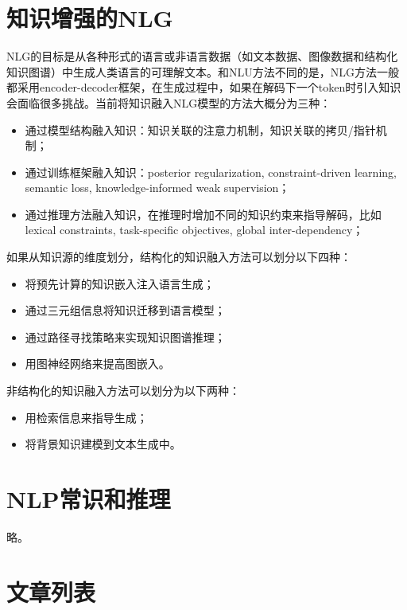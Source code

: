 \documentclass[11pt]{article}
\begin{document}
\section{知识增强的NLG}

NLG的目标是从各种形式的语言或非语言数据（如文本数据、图像数据和结构化知识图谱）中生成人类语言的可理解文本。和NLU方法不同的是，NLG方法一般都采用encoder-decoder框架，在生成过程中，如果在解码下一个token时引入知识会面临很多挑战。当前将知识融入NLG模型的方法大概分为三种：

\begin{itemize}
    \item 通过模型结构融入知识：知识关联的注意力机制，知识关联的拷贝/指针机制；
    \item 通过训练框架融入知识：posterior regularization, constraint-driven learning, semantic loss, knowledge-informed weak supervision；
    \item 通过推理方法融入知识，在推理时增加不同的知识约束来指导解码，比如lexical constraints, task-specific objectives, global inter-dependency；
\end{itemize}

如果从知识源的维度划分，结构化的知识融入方法可以划分以下四种：

\begin{itemize}
    \item 将预先计算的知识嵌入注入语言生成；
    \item 通过三元组信息将知识迁移到语言模型；
    \item 通过路径寻找策略来实现知识图谱推理；
    \item 用图神经网络来提高图嵌入。
\end{itemize}

非结构化的知识融入方法可以划分为以下两种：

\begin{itemize}
    \item 用检索信息来指导生成；
    \item 将背景知识建模到文本生成中。
\end{itemize}

\section{NLP常识和推理}

略。

\section{文章列表}
\end{document}
